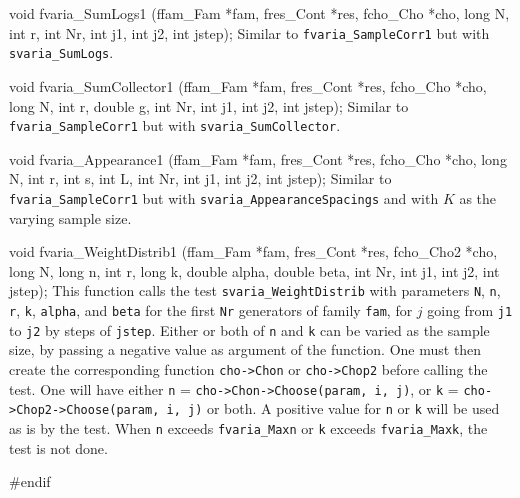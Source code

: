 void fvaria_SumLogs1 (ffam_Fam *fam, fres_Cont *res, fcho_Cho *cho,
                      long N, int r,
                      int Nr, int j1, int j2, int jstep);
\endcode
\tab  Similar to {\tt fvaria\_SampleCorr1} but with {\tt svaria\_SumLogs}.
\endtab
\code


void fvaria_SumCollector1 (ffam_Fam *fam, fres_Cont *res, fcho_Cho *cho,
                           long N, int r, double g,
                           int Nr, int j1, int j2, int jstep);
\endcode
\tab Similar to {\tt fvaria\_SampleCorr1} but with {\tt svaria\_SumCollector}.
\endtab
\code


void fvaria_Appearance1 (ffam_Fam *fam, fres_Cont *res, fcho_Cho *cho,
                         long N, int r, int s, int L,
                         int Nr, int j1, int j2, int jstep);
\endcode
\tab Similar to {\tt fvaria\_SampleCorr1} but with
  {\tt svaria\_AppearanceSpacings} and with $K$ as the varying sample size.
\endtab
\code


void fvaria_WeightDistrib1 (ffam_Fam *fam, fres_Cont *res, fcho_Cho2 *cho,
                            long N, long n, int r, long k,
                            double alpha, double beta,
                            int Nr, int j1, int j2, int jstep);
\endcode
\tab This function calls the test {\tt svaria\_WeightDistrib} with
  parameters {\tt N}, {\tt n},  {\tt r},  {\tt k}, {\tt alpha},
  and {\tt beta} for the
  first {\tt Nr} generators of family {\tt fam}, for $j$ going from
  {\tt j1} to {\tt j2} by steps of {\tt jstep}. Either or both of  {\tt n}
  and {\tt k} can be varied as the sample size, by passing a negative value as
  argument of the function. One must then create the corresponding function
  {\tt cho->Chon} or {\tt cho->Chop2} before calling the test.
  One will have either {\tt n} = {\tt cho->Chon->Choose(param, i, j)},
  or {\tt k} = {\tt cho->Chop2->Choose(param, i, j)} or both. A positive
  value for {\tt n} or {\tt k} will be used as is by the test. When {\tt n}
  exceeds {\tt fvaria\_Maxn} or {\tt k} exceeds {\tt fvaria\_Maxk},
  the test is not done.
\endtab

\code
\hide
#endif
\endhide
\endcode
